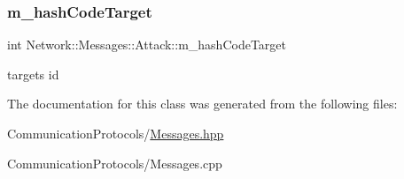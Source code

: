 \subsubsection{\texorpdfstring{m\+\_\+hash\+Code\+Target}{m\_hashCodeTarget}}
{\footnotesize\ttfamily int Network\+::\+Messages\+::\+Attack\+::m\+\_\+hash\+Code\+Target}

target\textquotesingle{}s id 

The documentation for this class was generated from the following files\+:\begin{DoxyCompactItemize}
\item 
Communication\+Protocols/\hyperlink{_messages_8hpp}{Messages.\+hpp}\item 
Communication\+Protocols/Messages.\+cpp\end{DoxyCompactItemize}
